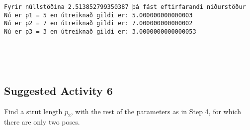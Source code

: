 \documentclass[11pt]{article}
\begin{document}
    \begin{Verbatim}[commandchars=\\\{\}]
Fyrir núllstöðina 2.513852799350387 þá fást eftirfarandi niðurstöður
Nú er p1 = 5 en útreiknað gildi er: 5.000000000000003
Nú er p2 = 7 en útreiknað gildi er: 7.000000000000002
Nú er p3 = 3 en útreiknað gildi er: 3.0000000000000053



    \end{Verbatim}

    \begin{center}
    \end{center}
    { \hspace*{\fill} \\}
    
    \newpage
    \hypertarget{suggested-activity-6}{%
\subsection*{Suggested Activity 6}\label{suggested-activity-6}}

Find a strut length \(p_2\), with the rest of the parameters as in Step
4, for which there are only two poses.
\end{document}
